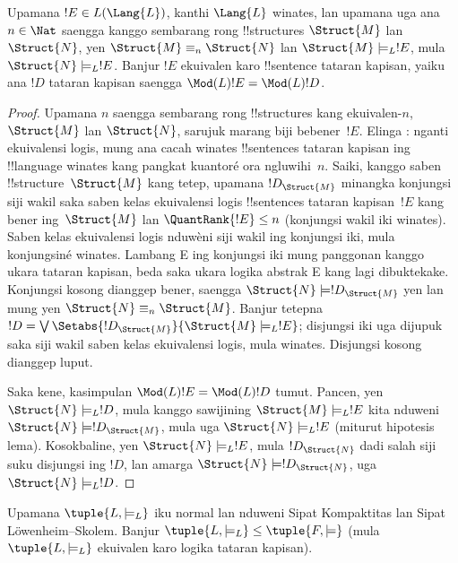 \documentclass[../../../include/open-logic-section]{subfiles}
\begin{document}


\begin{lem}
Upamana $!E \in L(\Lang{L})$, kanthi $\Lang{L}$ winates, lan
upamana uga ana $n \in \Nat$ saengga kanggo sembarang rong
!!{structure}s $\Struct{M}$ lan~$\Struct{N}$, yen $\Struct{M} \equiv_n
\Struct{N}$ lan $\Struct{M} \models_L !E$, mula $\Struct{N}
\models_L !E$. Banjur $!E$ ekuivalen karo !!{sentence}
tataran kapisan, yaiku ana $!D$ tataran kapisan saengga
$\Mod(L){!E} = \Mod(L){!D}$.
\end{lem}

\begin{proof}
Upamana $n$ saengga sembarang rong !!{structure}s kang ekuivalen-$n$,
$\Struct{M}$ lan $\Struct{N}$, sarujuk marang biji bebener~$!E$.
Elinga : nganti ekuivalensi logis,
mung ana cacah winates !!{sentence}s tataran kapisan ing
!!{language} winates kang pangkat kuantoré ora ngluwihi~$n$.
Saiki, kanggo
saben !!{structure}~$\Struct{M}$ kang tetep, upamana
$!D_{\Struct{M}}$ minangka konjungsi siji wakil saka saben kelas ekuivalensi logis !!{sentence}s
tataran kapisan~$!E$ kang bener ing~$\Struct{M}$ lan
$\QuantRank{!E} \le n$ (konjungsi wakil iki winates). Saben kelas ekuivalensi logis nduwèni siji wakil ing konjungsi iki, mula konjungsiné winates. Lambang E ing konjungsi iki mung panggonan kanggo ukara tataran kapisan, beda saka ukara logika abstrak E kang lagi dibuktekake. Konjungsi kosong dianggep bener, saengga
$\Struct{N} \models !D_{\Struct{M}}$ yen lan mung yen
$\Struct{N} \equiv_n \Struct{M}$. Banjur tetepna
$!D = \textstyle\bigvee
\Setabs{!D_{\Struct{M}}}{\Struct{M} \models_L !E}$; disjungsi iki
uga dijupuk saka siji wakil saben kelas ekuivalensi logis, mula winates. Disjungsi kosong dianggep luput.

Saka kene, kasimpulan $\Mod(L){!E} = \Mod(L){!D}$ tumut.
Pancen, yen $\Struct{N} \models_L !D$, mula kanggo sawijining
$\Struct{M} \models_L !E$ kita nduweni
$\Struct{N} \models !D_{\Struct{M}}$, mula uga
$\Struct{N} \models_L !E$ (miturut hipotesis lema).
Kosokbaline, yen $\Struct{N} \models_L !E$, mula
$!D_\Struct{N}$ dadi salah siji suku disjungsi ing $!D$,
lan amarga $\Struct{N} \models !D_\Struct{N}$, uga
$\Struct{N} \models_L !D$.
\end{proof}

\begin{thm}
   Upamana $\tuple{L, \models_L}$ iku normal lan nduweni
  Sipat Kompaktitas lan Sipat L\"owenheim--Skolem. Banjur
  $\tuple{L, \models_L} \le \tuple{F, \models}$ (mula
  $\tuple{L, \models_L}$ ekuivalen karo logika tataran kapisan).
\end{thm}
\end{document}
